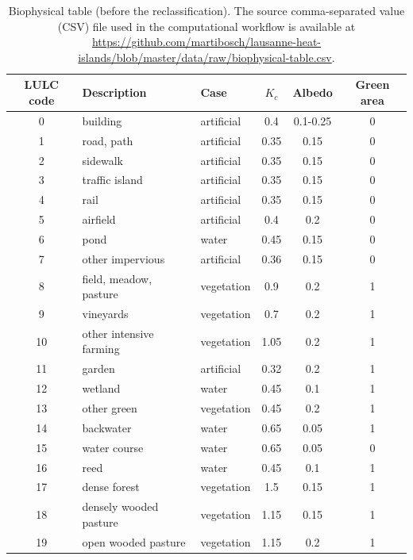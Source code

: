 \documentclass[12pt]{iopart}
\begin{document}
\begin{table}[!h]
    \caption{\label{tab:biophysical-table} Biophysical table (before the reclassification). The source comma-separated value (CSV) file used in the computational workflow is available at \url{https://github.com/martibosch/lausanne-heat-islands/blob/master/data/raw/biophysical-table.csv}.}
    \begin{center}
      \begin{tabular}{ c p{} p{} c c c }
        \toprule
        LULC code & Description & Case & $K_c$ & Albedo & Green area \\
        \midrule
        0 & building & artificial & 0.4 & 0.1-0.25 & 0 \\ %
        1 & road, path & artificial & 0.35 & 0.15 & 0 \\ %
        2 & sidewalk & artificial & 0.35 & 0.15 & 0 \\
        3 & traffic island & artificial & 0.35 & 0.15 & 0 \\
        4 & rail & artificial & 0.35 & 0.15 & 0 \\
        5 & airfield & artificial & 0.4 & 0.2 & 0 \\
        6 & pond & water & 0.45 & 0.15 & 0 \\
        7 & other impervious & artificial & 0.36 & 0.15 & 0 \\
        8 & field, meadow, pasture & vegetation & 0.9 & 0.2 & 1 \\
        9 & vineyards & vegetation & 0.7 & 0.2 & 1 \\
        10 & other intensive farming & vegetation & 1.05 & 0.2 & 1 \\
        11 & garden & artificial & 0.32 & 0.2 & 1 \\
        12 & wetland & water & 0.45 & 0.1 & 1 \\
        13 & other green & vegetation & 0.45 & 0.2 & 1 \\
        14 & backwater & water & 0.65 & 0.05 & 1 \\
        15 & water course & water & 0.65 & 0.05 & 0\\
        16 & reed & water & 0.45 & 0.1 & 1\\
        17 & dense forest & vegetation & 1.5 & 0.15 & 1 \\
        18 & densely wooded pasture & vegetation & 1.15 & 0.15 & 1 \\
        19 & open wooded pasture & vegetation & 1.15 & 0.2 & 1 \\

\end{tabular}
\end{center}
\end{table}
\end{document}
